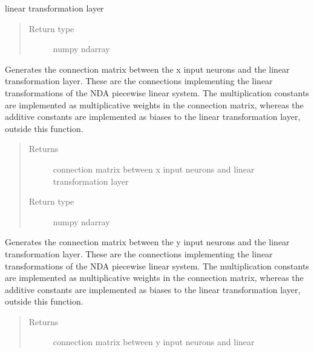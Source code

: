 \documentclass[letterpaper,10pt,english]{sphinxmanual}
\begin{document}
\begin{fulllineitems}
\begin{fulllineitems}
\begin{quote}
\begin{description}
\end{description}\end{quote}

linear transformation layer
\begin{quote}\begin{description}
\item[{Return type}] \leavevmode
numpy ndarray

\end{description}\end{quote}

\end{fulllineitems}


\begin{fulllineitems}
\label{neuraltm_docs:neuraltm.NeuralTM.cn_MCLx_LTL}
Generates the connection matrix between the x input neurons and
the linear transformation layer.  These are the connections
implementing the linear transformations of the NDA piecewise
linear system.  The multiplication constants are implemented
as multiplicative weights in the connection matrix, whereas
the additive constants are implemented as biases to the linear
transformation layer, outside this function.
\begin{quote}\begin{description}
\item[{Returns}] \leavevmode
connection matrix between x input neurons and linear
transformation layer

\item[{Return type}] \leavevmode
numpy ndarray

\end{description}\end{quote}

\end{fulllineitems}


\begin{fulllineitems}
\label{neuraltm_docs:neuraltm.NeuralTM.cn_MCLy_LTL}
Generates the connection matrix between the y input neurons and
the linear transformation layer.  These are the connections
implementing the linear transformations of the NDA piecewise
linear system.  The multiplication constants are implemented
as multiplicative weights in the connection matrix, whereas
the additive constants are implemented as biases to the linear
transformation layer, outside this function.
\begin{quote}\begin{description}
\item[{Returns}] \leavevmode
connection matrix between y input neurons and linear


\end{description}
\end{quote}
\end{fulllineitems}
\end{fulllineitems}
\end{document}
